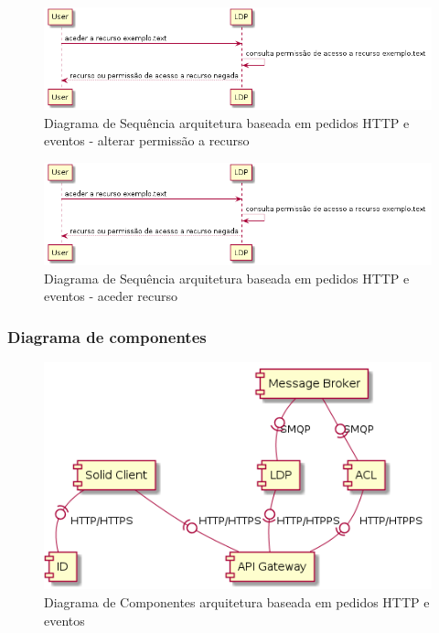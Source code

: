 \begin{figure}[H]
    \begin{center}
    \includegraphics[width=1 \textwidth]{figures/arquitetura_2_access_resource}
    \caption{Diagrama de Sequência arquitetura baseada em pedidos HTTP e eventos - alterar permissão a recurso}
    \end{center}
\end{figure}

\begin{figure}[H]
    \begin{center}
    \includegraphics[width=1 \textwidth]{figures/arquitetura_2_access_resource}
    \caption{Diagrama de Sequência arquitetura baseada em pedidos HTTP e eventos - aceder recurso}
    \end{center}
\end{figure}


\subsubsection{Diagrama de componentes}
\begin{figure}[H]
    \begin{center}
    \includegraphics[width=1 \textwidth]{figures/component_diagram.png}
    \caption{Diagrama de Componentes arquitetura baseada em pedidos HTTP e eventos}
    \end{center}
\end{figure}

